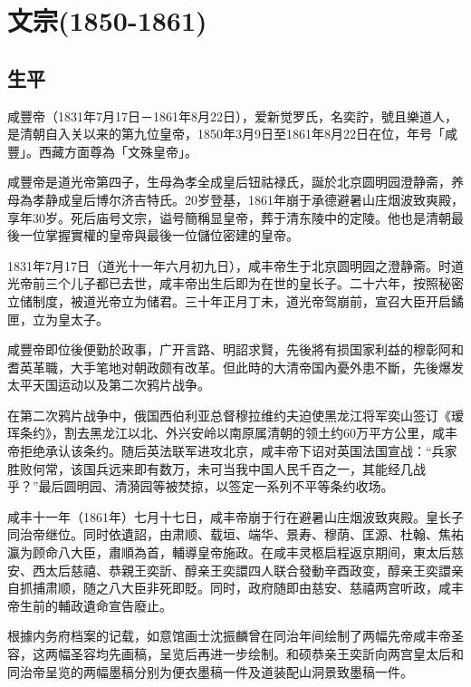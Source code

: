
\section{文宗\tiny(1850-1861)}

\subsection{生平}

咸豐帝（1831年7月17日－1861年8月22日），爱新觉罗氏，名奕詝，號且樂道人，是清朝自入关以来的第九位皇帝，1850年3月9日至1861年8月22日在位，年号「咸豐」。西藏方面尊為「文殊皇帝」。

咸豐帝是道光帝第四子，生母為孝全成皇后钮祜禄氏，誕於北京圆明园澄静斋，养母為孝静成皇后博尔济吉特氏。20岁登基，1861年崩于承德避暑山庄烟波致爽殿，享年30岁。死后庙号文宗，谥号簡稱显皇帝，葬于清东陵中的定陵。他也是清朝最後一位掌握實權的皇帝與最後一位儲位密建的皇帝。

1831年7月17日（道光十一年六月初九日），咸丰帝生于北京圆明园之澄静斋。时道光帝前三个儿子都已去世，咸丰帝出生后即为在世的皇长子。二十六年，按照秘密立储制度，被道光帝立为储君。三十年正月丁未，道光帝驾崩前，宣召大臣开启鐍匣，立为皇太子。

咸豐帝即位後便勤於政事，广开言路、明詔求賢，先後將有损国家利益的穆彰阿和耆英革職，大手笔地对朝政颇有改革。但此時的大清帝国內憂外患不斷，先後爆发太平天国运动以及第二次鸦片战争。

在第二次鸦片战争中，俄国西伯利亚总督穆拉维约夫迫使黑龙江将军奕山签订《瑷珲条约》，割去黑龙江以北、外兴安岭以南原属清朝的领土约60万平方公里，咸丰帝拒绝承认该条约。随后英法联军进攻北京，咸丰帝下诏对英国法国宣战：“兵家胜败何常，该国兵远来即有数万，未可当我中国人民千百之一，其能经几战乎？”最后圆明园、清漪园等被焚掠，以签定一系列不平等条约收场。

咸丰十一年（1861年）七月十七日，咸丰帝崩于行在避暑山庄烟波致爽殿。皇长子同治帝继位。同时依遺詔，由肃顺、载垣、端华、景寿、穆荫、匡源、杜翰、焦祐瀛为顾命八大臣，肅順為首，輔導皇帝施政。在咸丰灵柩启程返京期间，東太后慈安、西太后慈禧、恭親王奕訢、醇亲王奕譞四人联合發動辛酉政变，醇亲王奕譞亲自抓捕肃顺，随之八大臣非死即貶。同时，政府随即由慈安、慈禧两宫听政，咸丰帝生前的輔政遺命宣告廢止。

根據内务府档案的记载，如意馆画士沈振麟曾在同治年间绘制了两幅先帝咸丰帝圣容，这两幅圣容均先画稿，呈览后再进一步绘制。和硕恭亲王奕訢向两宫皇太后和同治帝呈览的两幅墨稿分别为便衣墨稿一件及道装配山洞景致墨稿一件。

